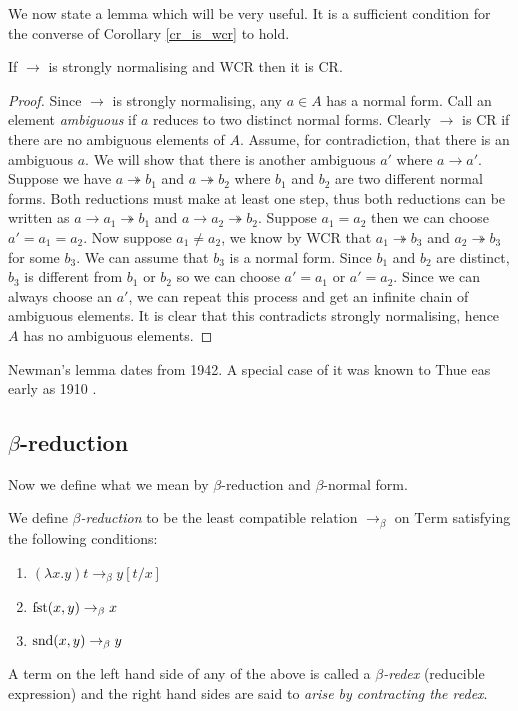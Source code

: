 We now state a lemma which will be very useful. It is a sufficient condition for the converse of Corollary \ref{cr_is_wcr} to hold.

\begin{lemma}\label{newman}
    If $\to$ is strongly normalising and WCR then it is CR.
\end{lemma}

\begin{proof}
    Since $\to$ is strongly normalising, any $a \in A$ has a normal form. Call an element \emph{ambiguous} if $a$ reduces to two distinct normal forms. Clearly $\to$ is CR if there are no ambiguous elements of $A$.
    Assume, for contradiction, that there is an ambiguous $a$. We will show that there is another ambiguous $a'$ where $a \to a'$.
    Suppose we have $a \twoheadrightarrow b_1$ and $a \twoheadrightarrow b_2$ where $b_1$ and $b_2$ are two different normal forms. Both reductions must make at least one step, thus both reductions can be written as $a \to a_1 \twoheadrightarrow b_1$ and $a \to a_2 \twoheadrightarrow b_2$.
    Suppose $a_1 = a_2$ then we can choose $a' = a_1 = a_2$. Now suppose $a_1 \neq a_2$, we know by WCR that $a_1 \twoheadrightarrow b_3$ and $a_2 \twoheadrightarrow b_3$ for some $b_3$. We can assume that $b_3$ is a normal form. Since $b_1$ and $b_2$ are distinct, $b_3$ is different from $b_1$ or $b_2$ so we can choose $a' = a_1$ or $a'=a_2$.
    Since we can always choose an $a'$, we can repeat this process and get an infinite chain of ambiguous elements. It is clear that this contradicts strongly normalising, hence $A$ has no ambiguous elements.
\end{proof}

\begin{remark}
    Newman's lemma dates from 1942. A special case of it was known to Thue eas early as 1910 \cite{Steinby_treesand}.
\end{remark}


\subsection{ \texorpdfstring{$\beta$}{}-reduction}

Now we define what we mean by $\beta$-reduction and $\beta$-normal form.

\begin{defin}\label{beta_reduction}
    We define \emph{$\beta$-reduction} to be the least compatible relation $\to_{\beta}$ on $\mathrm{Term}$ satisfying the following conditions:
    \begin{enumerate}
        \item $(\lambda x . y)t \to_{\beta} y [t / x]$
        \item $\mathrm{fst}(x,y) \to_{\beta} x$
        \item $\mathrm{snd}(x,y) \to_{\beta} y$
    \end{enumerate}
    A term on the left hand side of any of the above is called a \emph{$\beta$-redex} (reducible expression) and the right hand sides are said to \emph{arise by contracting the redex}.
\end{defin}

